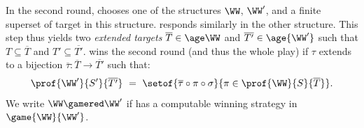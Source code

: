 In the second round, \Spoiler chooses one of the structures $\WW$, $\WW'$,
and 
a finite superset of target in this structure.
\Reducer responds similarly in the other structure.
This step thus yields two \emph{extended targets}  $\overline T\in\age\WW$ and $\overline{T'}\in\age{\WW'}$ such that
$T\subseteq \overline T$ and $T'\subseteq \overline{T'}$.
%
\Reducer wins the second round (and thus the whole play) if 
$\tau$ extends to a bijection $\overline\tau : \overline T\to \overline{T'}$ 
such that:
%
\begin{align} \label{eq:win2}
\prof {\WW'} {S'} {\overline{T'}} \ = \ 
\setof{\overline\tau \circ \pi \circ \sigma}{\pi \in \prof {\WW} {S} {\overline T}}.
\end{align}
%
%
We write $\WW \gamered \WW'$ if \Reducer has a computable winning strategy in  
$\game {\WW} {\WW'}$.

%

